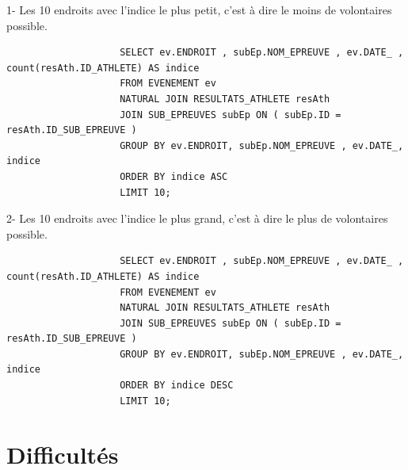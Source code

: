 \documentclass[]{scrreprt}
\begin{document}
			{\large 
				1- Les 10 endroits avec l'indice le plus petit, c'est à dire le moins de volontaires possible.
				
			}
			
			{\footnotesize 
				\begin{tcolorbox}
					\begin{verbatim}
					SELECT ev.ENDROIT , subEp.NOM_EPREUVE , ev.DATE_ , count(resAth.ID_ATHLETE) AS indice
					FROM EVENEMENT ev
					NATURAL JOIN RESULTATS_ATHLETE resAth
					JOIN SUB_EPREUVES subEp ON ( subEp.ID = resAth.ID_SUB_EPREUVE )
					GROUP BY ev.ENDROIT, subEp.NOM_EPREUVE , ev.DATE_, indice
					ORDER BY indice ASC
					LIMIT 10;
					\end{verbatim}
				\end{tcolorbox}
			}
			
			\vspace{0.5cm}
			
			
			{\large 
				2- Les 10 endroits avec l'indice le plus grand, c'est à dire le plus de volontaires possible.
				
			}
			
			{\footnotesize 
				\begin{tcolorbox}
					\begin{verbatim}
					SELECT ev.ENDROIT , subEp.NOM_EPREUVE , ev.DATE_ , count(resAth.ID_ATHLETE) AS indice
					FROM EVENEMENT ev
					NATURAL JOIN RESULTATS_ATHLETE resAth
					JOIN SUB_EPREUVES subEp ON ( subEp.ID = resAth.ID_SUB_EPREUVE )
					GROUP BY ev.ENDROIT, subEp.NOM_EPREUVE , ev.DATE_, indice
					ORDER BY indice DESC
					LIMIT 10;
					\end{verbatim}
				\end{tcolorbox}
			}
		
	\chapter{Difficultés}
	\label{Chapter6}
		
\end{document}
